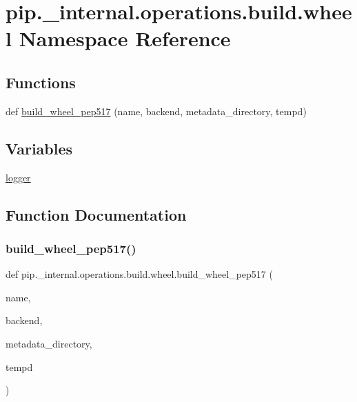 \hypertarget{namespacepip_1_1__internal_1_1operations_1_1build_1_1wheel}{}\section{pip.\+\_\+internal.\+operations.\+build.\+wheel Namespace Reference}
\label{namespacepip_1_1__internal_1_1operations_1_1build_1_1wheel}
\subsection*{Functions}
\begin{DoxyCompactItemize}
\item 
def \hyperlink{namespacepip_1_1__internal_1_1operations_1_1build_1_1wheel_a16f028dd007c189ddbac11a5715422d5}{build\+\_\+wheel\+\_\+pep517} (name, backend, metadata\+\_\+directory, tempd)
\end{DoxyCompactItemize}
\subsection*{Variables}
\begin{DoxyCompactItemize}
\item 
\hyperlink{namespacepip_1_1__internal_1_1operations_1_1build_1_1wheel_a70bfdf51c1b6129956d5dc1d16032a61}{logger}
\end{DoxyCompactItemize}


\subsection{Function Documentation}
\mbox{\label{namespacepip_1_1__internal_1_1operations_1_1build_1_1wheel_a16f028dd007c189ddbac11a5715422d5}} 
\subsubsection{\texorpdfstring{build\+\_\+wheel\+\_\+pep517()}{build\_wheel\_pep517()}}
{\footnotesize\ttfamily def pip.\+\_\+internal.\+operations.\+build.\+wheel.\+build\+\_\+wheel\+\_\+pep517 (\begin{DoxyParamCaption}\item[{}]{name,  }\item[{}]{backend,  }\item[{}]{metadata\+\_\+directory,  }\item[{}]{tempd }\end{DoxyParamCaption})}

